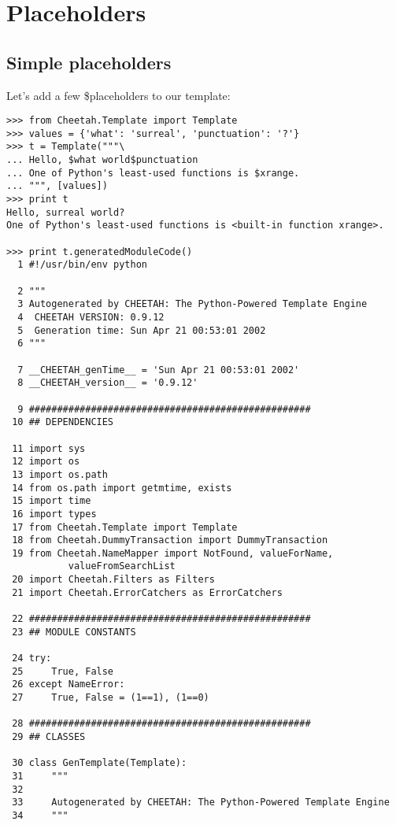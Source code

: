 \section{Placeholders}
\label{placeholders}

\subsection{Simple placeholders}
\label{placeholders.simple}

Let's add a few \$placeholders to our template:

\begin{verbatim}
>>> from Cheetah.Template import Template
>>> values = {'what': 'surreal', 'punctuation': '?'}
>>> t = Template("""\
... Hello, $what world$punctuation
... One of Python's least-used functions is $xrange.
... """, [values])
>>> print t
Hello, surreal world?
One of Python's least-used functions is <built-in function xrange>.

>>> print t.generatedModuleCode()
  1	#!/usr/bin/env python
    
  2	"""
  3	Autogenerated by CHEETAH: The Python-Powered Template Engine
  4	 CHEETAH VERSION: 0.9.12
  5	 Generation time: Sun Apr 21 00:53:01 2002
  6	"""
    
  7	__CHEETAH_genTime__ = 'Sun Apr 21 00:53:01 2002'
  8	__CHEETAH_version__ = '0.9.12'
    
  9	##################################################
 10	## DEPENDENCIES
    
 11	import sys
 12	import os
 13	import os.path
 14	from os.path import getmtime, exists
 15	import time
 16	import types
 17	from Cheetah.Template import Template
 18	from Cheetah.DummyTransaction import DummyTransaction
 19	from Cheetah.NameMapper import NotFound, valueForName, 
           valueFromSearchList
 20	import Cheetah.Filters as Filters
 21	import Cheetah.ErrorCatchers as ErrorCatchers
    
 22	##################################################
 23	## MODULE CONSTANTS
    
 24	try:
 25	    True, False
 26	except NameError:
 27	    True, False = (1==1), (1==0)
    
 28	##################################################
 29	## CLASSES
    
 30	class GenTemplate(Template):
 31	    """
 32	    
 33	    Autogenerated by CHEETAH: The Python-Powered Template Engine
 34	    """
    

\end{verbatim}
